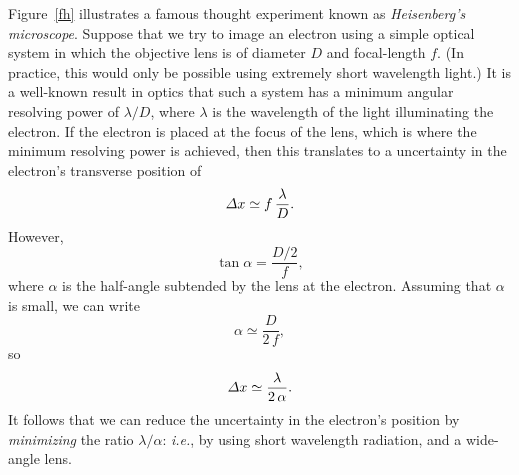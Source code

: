 Figure~\ref{fh} illustrates a famous thought experiment known as
{\em Heisenberg's microscope}. Suppose that we try to image an
electron using a simple optical system in which the objective lens is of
diameter $D$ and focal-length $f$. (In practice, this would only
be possible using extremely short wavelength light.) It is a
well-known result in optics that such a  system has a
minimum angular resolving power of $\lambda/D$, where $\lambda$
is the wavelength of the light illuminating the electron. If the electron is placed at the focus
of the lens, which is where the minimum resolving power is achieved,  then this translates to a  uncertainty in the
electron's transverse position of
\begin{equation}
{\mit\Delta}x \simeq f\,\frac{\lambda}{D}.
\end{equation}
However, 
\begin{equation}
\tan\alpha = \frac{D/2}{f},
\end{equation}
where $\alpha$ is the half-angle subtended by the lens at the electron.
Assuming that $\alpha$ is small, we can write
\begin{equation}
\alpha\simeq \frac{D}{2\,f},
\end{equation}
so
\begin{equation}
{\mit\Delta} x\simeq \frac{\lambda}{2\,\alpha}.
\end{equation}
It follows that we can reduce the uncertainty in the electron's position
by {\em minimizing}\/ the ratio $\lambda/\alpha$: {\em i.e.}, by using short
wavelength radiation, and a wide-angle lens. 

